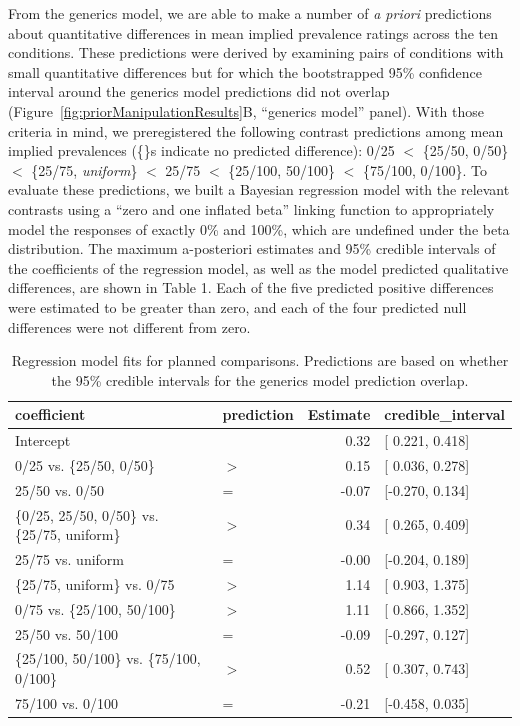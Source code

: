 \documentclass[floatsintext,doc]{apa6}
\theoremstyle{definition}
\theoremstyle{definition}
\theoremstyle{definition}
\theoremstyle{remark}
\begin{document}
From the generics model, we are able to make a number of \emph{a priori}
predictions about quantitative differences in mean implied prevalence
ratings across the ten conditions. These predictions were derived by
examining pairs of conditions with small quantitative differences but
for which the bootstrapped 95\% confidence interval around the generics
model predictions did not overlap
(Figure~\ref{fig:priorManipulationResults}B, \enquote{generics model}
panel). With those criteria in mind, we preregistered the following
contrast predictions among mean implied prevalences (\{\}s indicate no predicted difference): 0/25
\(<\) \{25/50, 0/50\} \(<\) \{25/75, \emph{uniform}\} \(<\) 25/75 \(<\)
\{25/100, 50/100\} \(<\) \{75/100, 0/100\}. To evaluate these
predictions, we built a Bayesian regression model with the relevant
contrasts using a \enquote{zero and one inflated beta} linking function
to appropriately model the responses of exactly 0\% and 100\%, which are
undefined under the beta distribution. The maximum a-posteriori
estimates and 95\% credible intervals of the coefficients of the
regression model, as well as the model predicted qualitative
differences, are shown in Table 1. Each of the five predicted positive
differences were estimated to be greater than zero, and each of the four
predicted null differences were not different from zero.

\begin{table}[h]
\centering
\begingroup\fontsize{9pt}{10pt}\selectfont
\begin{tabular}{llrl}
  \hline
coefficient & prediction & Estimate & credible\_interval \\ 
  \hline
Intercept &  & 0.32 & [ 0.221, 0.418] \\ 
  0/25 vs. \{25/50, 0/50\} & $>$ & 0.15 & [ 0.036, 0.278] \\ 
  25/50 vs. 0/50 & = & -0.07 & [-0.270, 0.134] \\ 
  \{0/25, 25/50, 0/50\} vs. \{25/75, uniform\} & $>$ & 0.34 & [ 0.265, 0.409] \\ 
  25/75 vs. uniform & = & -0.00 & [-0.204, 0.189] \\ 
  \{25/75, uniform\} vs. 0/75 & $>$ & 1.14 & [ 0.903, 1.375] \\ 
  0/75 vs. \{25/100, 50/100\} & $>$ & 1.11 & [ 0.866, 1.352] \\ 
  25/50 vs. 50/100 & = & -0.09 & [-0.297, 0.127] \\ 
  \{25/100, 50/100\} vs. \{75/100, 0/100\} & $>$ & 0.52 & [ 0.307, 0.743] \\ 
  75/100 vs. 0/100 & = & -0.21 & [-0.458, 0.035] \\ 
   \hline
\end{tabular}
\endgroup
\caption{Regression model fits for planned comparisons. Predictions are based on whether the 95\% credible intervals for the generics model prediction overlap.} 
\end{table}
\end{document}
